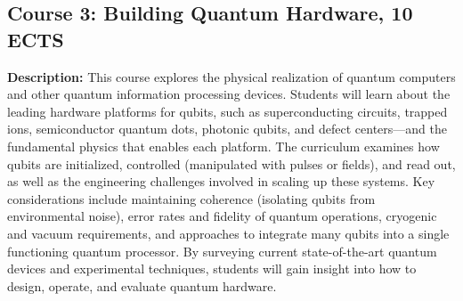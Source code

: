 \documentclass{scrreprt}
\begin{document}
\subsection{Course 3: Building Quantum Hardware, 10 ECTS}

\textbf{Description:} This course explores the physical realization of
quantum computers and other quantum information processing
devices. Students will learn about the leading hardware platforms for
qubits, such as superconducting circuits, trapped ions, semiconductor
quantum dots, photonic qubits, and defect centers—and the fundamental
physics that enables each platform. The curriculum examines how qubits
are initialized, controlled (manipulated with pulses or fields), and
read out, as well as the engineering challenges involved in scaling up
these systems. Key considerations include maintaining coherence
(isolating qubits from environmental noise), error rates and fidelity
of quantum operations, cryogenic and vacuum requirements, and
approaches to integrate many qubits into a single functioning quantum
processor. By surveying current state-of-the-art quantum devices and
experimental techniques, students will gain insight into how to
design, operate, and evaluate quantum hardware.
\end{document}
